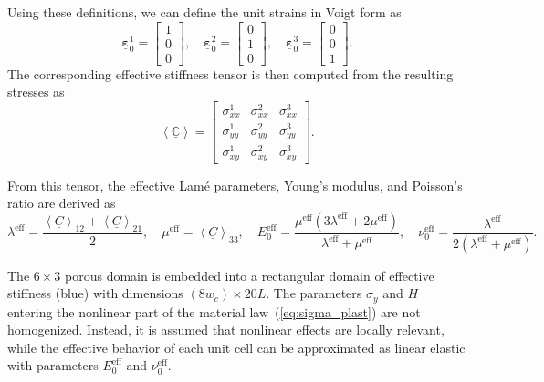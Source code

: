 \documentclass[pdflatex,sn-mathphys-num]{sn-jnl}%
\theoremstyle{thmstyleone}%
\theoremstyle{thmstyletwo}%
\theoremstyle{thmstylethree}%
\begin{document}
Using these definitions, we can define the unit strains in Voigt form as
\begin{equation}
\underline{\boldsymbol{\varepsilon}}_0^1 =
\begin{bmatrix} 1 \\ 0 \\ 0 \end{bmatrix}, \quad
\underline{\boldsymbol{\varepsilon}}_0^2 =
\begin{bmatrix} 0 \\ 1 \\ 0 \end{bmatrix}, \quad
\underline{\boldsymbol{\varepsilon}}_0^3 =
\begin{bmatrix} 0 \\ 0 \\ 1 \end{bmatrix}.
\end{equation}
The corresponding effective stiffness tensor is then computed from the resulting stresses as
\begin{equation}
    \left< \underline{\boldsymbol{\mathbb{C}}} \right> =
    \begin{bmatrix}
         \sigma_{xx}^1 & \sigma_{xx}^2 & \sigma_{xx}^3 \\
         \sigma_{yy}^1 & \sigma_{yy}^2 & \sigma_{yy}^3 \\
         \sigma_{xy}^1 & \sigma_{xy}^2 & \sigma_{xy}^3
     \end{bmatrix}.
\end{equation}


From this tensor, the effective Lamé parameters, Young’s modulus, and Poisson’s ratio are derived as
\begin{equation}
    \lambda^{\text{eff}} = \dfrac{\left< \underline{C} \right>_{12} + \left< \underline{C} \right>_{21}}{2}, \quad
    \mu^{\text{eff}} = \left< \underline{C} \right>_{33}, \quad
    E_0^{\text{eff}} = \dfrac{\mu^{\text{eff}} (3 \lambda^{\text{eff}} + 2 \mu^{\text{eff}})}{\lambda^{\text{eff}} + \mu^{\text{eff}}}, \quad
    \nu_0^{\text{eff}} = \dfrac{\lambda^{\text{eff}}}{2 (\lambda^{\text{eff}} + \mu^{\text{eff}})}.
\end{equation}

The $6 \times 3$ porous domain is embedded into a rectangular domain of effective stiffness (blue) with dimensions $(8 w_c) \times 20 L$. The parameters $\sigma_y$ and $H$ entering the nonlinear part of the material law~(\ref{eq:sigma_plast}) are not homogenized. 
Instead, it is assumed that nonlinear effects are locally relevant, while the effective behavior of each unit cell can be approximated as linear elastic with parameters $E_0^{\text{eff}}$ and $\nu_0^{\text{eff}}$. 
\end{document}
